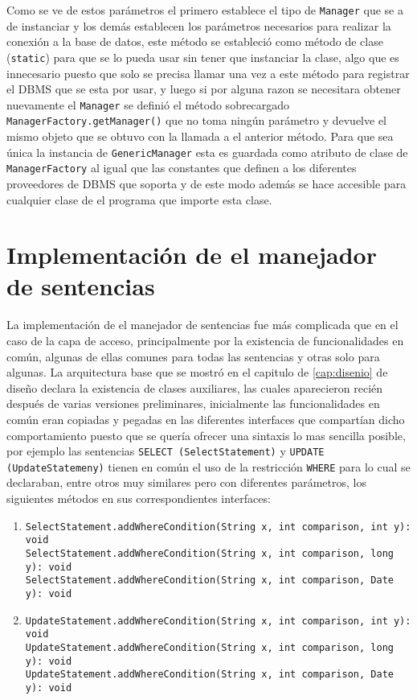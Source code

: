 Como se ve de estos parámetros el primero establece el tipo de \verb=Manager= que se a de instanciar y los demás establecen los parámetros necesarios para realizar la conexión a la base de datos, este método se estableció como método de clase (\verb=static=) para que se lo pueda usar sin tener que instanciar la clase, algo que es innecesario puesto que solo se precisa llamar una vez a este método para registrar el DBMS que se esta por usar, y luego si por alguna razon se necesitara obtener nuevamente el \verb=Manager= se definió el método sobrecargado \verb=ManagerFactory.getManager()= que no toma ningún parámetro y devuelve el mismo objeto que se obtuvo con la llamada a el anterior método. Para que sea única la instancia de \verb=GenericManager= esta es guardada como atributo de clase de \verb=ManagerFactory= al igual que las constantes que definen a los diferentes proveedores de DBMS que soporta \jj y de este modo además se hace accesible para cualquier clase de el programa que importe esta clase.
%
\section{Implementación de el manejador de sentencias}
La implementación de el manejador de sentencias fue más complicada que en el caso de la capa de acceso, principalmente por la existencia de funcionalidades en común, algunas de ellas comunes para todas las sentencias y otras solo para algunas. La arquitectura base que se mostró en el capitulo de \ref{cap:disenio} de diseño declara la existencia de clases auxiliares, las cuales aparecieron recién después de varias versiones preliminares, inicialmente las funcionalidades en común eran copiadas y pegadas en las diferentes interfaces que compartían dicho comportamiento puesto que se quería ofrecer una sintaxis lo mas sencilla posible, por ejemplo las sentencias \verb=SELECT (SelectStatement)= y \verb=UPDATE (UpdateStatemeny)= tienen en común el uso de la restricción \verb=WHERE= para lo cual se declaraban, entre otros muy similares pero con diferentes parámetros, los siguientes métodos en sus correspondientes interfaces:
%
\begin{enumerate}
\item \verb=SelectStatement.addWhereCondition(String x, int comparison, int y): void= \\
	\verb=SelectStatement.addWhereCondition(String x, int comparison, long y): void= \\
	\verb=SelectStatement.addWhereCondition(String x, int comparison, Date y): void= \\
\item \verb=UpdateStatement.addWhereCondition(String x, int comparison, int y): void= \\
	\verb=UpdateStatement.addWhereCondition(String x, int comparison, long y): void= \\
	\verb=UpdateStatement.addWhereCondition(String x, int comparison, Date y): void= \\
\end{enumerate}   
%

